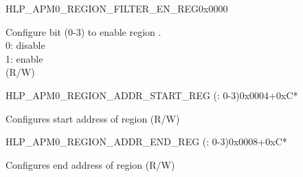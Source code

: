 \begin{register}{H}{LP\_APM0\_REGION\_FILTER\_EN\_REG}{0x0000}\label{regdesc:LPAPM0REGIONFILTERENREG}
%
%
\regnewline%
\begin{regdesc}\begin{reglist}
\label{fielddesc:LPAPM0REGIONFILTEREN}\item [LP\_APM0\_REGION\_FILTER\_EN] Configure bit (0-3) to enable region .\\ 
0: disable \\ 
1: enable  \\ (R/W)
\end{reglist}\end{regdesc}
\end{register}


\begin{register}{H}{LP\_APM0\_REGION\_ADDR\_START\_REG (: 0-3)}{0x0004+0xC*}\label{regdesc:LPAPM0REGION0ADDRSTARTREG}
%
\regnewline%
\begin{regdesc}\begin{reglist}
\label{fielddesc:LPAPM0REGION0ADDRSTART}\item [LP\_APM0\_REGION\regindex{n}\_ADDR\_START] Configures start address of region  (R/W)
\end{reglist}\end{regdesc}
\end{register}

\begin{register}{H}{LP\_APM0\_REGION\_ADDR\_END\_REG (: 0-3)}{0x0008+0xC*}\label{regdesc:LPAPM0REGION0ADDRENDREG}
%
\regnewline%
\begin{regdesc}\begin{reglist}
\label{fielddesc:LPAPM0REGION0ADDREND}\item [LP\_APM0\_REGION\regindex{n}\_ADDR\_END] Configures end address of region  (R/W)
\end{reglist}\end{regdesc}
\end{register}

















